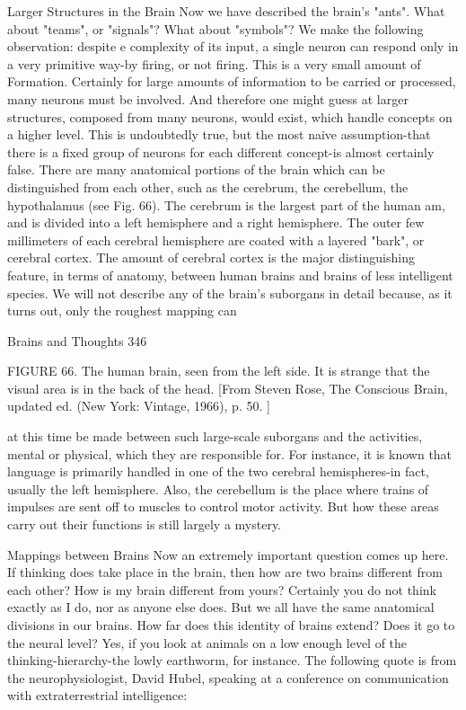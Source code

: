                          Larger Structures in the Brain
Now we have described the brain's "ants". What about "teams", or "signals"? What about
"symbols"? We make the following observation: despite e complexity of its input, a
single neuron can respond only in a very primitive way-by firing, or not firing. This is a
very small amount of Formation. Certainly for large amounts of information to be carried
or processed, many neurons must be involved. And therefore one might guess at larger
structures, composed from many neurons, would exist, which handle concepts on a
higher level. This is undoubtedly true, but the most naive assumption-that there is a fixed
group of neurons for each different concept-is almost certainly false.
         There are many anatomical portions of the brain which can be distinguished from
each other, such as the cerebrum, the cerebellum, the hypothalamus (see Fig. 66). The
cerebrum is the largest part of the human am, and is divided into a left hemisphere and a
right hemisphere. The outer few millimeters of each cerebral hemisphere are coated with
a layered "bark", or cerebral cortex. The amount of cerebral cortex is the major
distinguishing feature, in terms of anatomy, between human brains and brains of less
intelligent species. We will not describe any of the brain's suborgans in detail because, as
it turns out, only the roughest mapping can




Brains and Thoughts                                                                      346

FIGURE 66. The human brain, seen from the left side. It is strange that the visual area is
in the back of the head. [From Steven Rose, The Conscious Brain, updated ed. (New
York: Vintage, 1966), p. 50. ]

at this time be made between such large-scale suborgans and the activities, mental or
physical, which they are responsible for. For instance, it is known that language is
primarily handled in one of the two cerebral hemispheres-in fact, usually the left
hemisphere. Also, the cerebellum is the place where trains of impulses are sent off to
muscles to control motor activity. But how these areas carry out their functions is still
largely a mystery.

                            Mappings between Brains
Now an extremely important question comes up here. If thinking does take place in the
brain, then how are two brains different from each other? How is my brain different from
yours? Certainly you do not think exactly as I do, nor as anyone else does. But we all
have the same anatomical divisions in our brains. How far does this identity of brains
extend? Does it go to the neural level? Yes, if you look at animals on a low enough level
of the thinking-hierarchy-the lowly earthworm, for instance. The following quote is from
the neurophysiologist, David Hubel, speaking at a conference on communication with
extraterrestrial intelligence:

